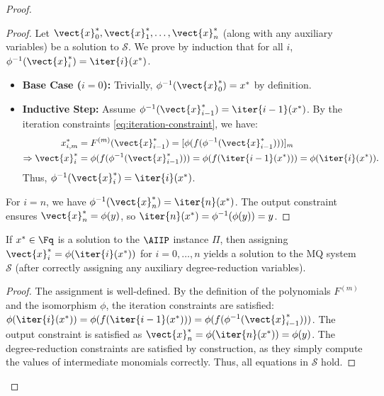 \begin{proof}
\begin{claim}
                \end{claim}
                \begin{proof}
                    Let $\vect{x}_0^*, \vect{x}_1^*, \ldots, \vect{x}_n^*$ (along with any auxiliary variables) be a solution to $\mathcal{S}$. We prove by induction that for all $i$, $\phi^{-1}(\vect{x}_i^*) = \iter{i}(x^*)$.
                    \begin{itemize}
                        \item \textbf{Base Case ($i=0$):} Trivially, $\phi^{-1}(\vect{x}_0^*) = x^*$ by definition.
                        \item \textbf{Inductive Step:} Assume $\phi^{-1}(\vect{x}_{i-1}^*) = \iter{i-1}(x^*)$. By the iteration constraints \eqref{eq:iteration-constraint}, we have:
                        \begin{align*}
                            x_{i,m}^* &= F^{(m)}(\vect{x}_{i-1}^*) = [\phi(f(\phi^{-1}(\vect{x}_{i-1}^*)))]_m \\
                            \Rightarrow \vect{x}_i^* &= \phi(f(\phi^{-1}(\vect{x}_{i-1}^*))) = \phi(f(\iter{i-1}(x^*))) = \phi(\iter{i}(x^*)).
                        \end{align*}
                        Thus, $\phi^{-1}(\vect{x}_i^*) = \iter{i}(x^*)$.
                    \end{itemize}
                    For $i = n$, we have $\phi^{-1}(\vect{x}_n^*) = \iter{n}(x^*)$. The output constraint ensures $\vect{x}_n^* = \phi(y)$, so $\iter{n}(x^*) = \phi^{-1}(\phi(y)) = y$.
                \end{proof}
                \begin{claim}\label{claim:correctness2}
                    If $x^* \in \Fq$ is a solution to the $\AIIP$ instance $\Pi$, then assigning $\vect{x}_i^* = \phi(\iter{i}(x^*))$ for $i=0,\ldots,n$ yields a solution to the MQ system $\mathcal{S}$ (after correctly assigning any auxiliary degree-reduction variables).
                \end{claim}
                \begin{proof}
                    The assignment is well-defined. By the definition of the polynomials $F^{(m)}$ and the isomorphism $\phi$, the iteration constraints are satisfied: $\phi(\iter{i}(x^*)) = \phi(f(\iter{i-1}(x^*))) = \phi(f(\phi^{-1}(\vect{x}_{i-1}^*))) $. The output constraint is satisfied as $\vect{x}_n^* = \phi(\iter{n}(x^*)) = \phi(y)$. The degree-reduction constraints are satisfied by construction, as they simply compute the values of intermediate monomials correctly. Thus, all equations in $\mathcal{S}$ hold.

\end{proof}
\end{proof}
